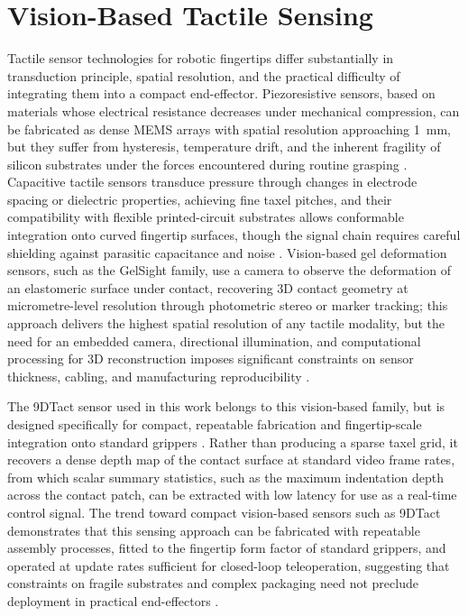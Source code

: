 \documentclass[12pt, a4paper]{report}
\begin{document}
\section{Vision-Based Tactile Sensing}
Tactile sensor technologies for robotic fingertips differ substantially in transduction principle, spatial resolution, and the practical difficulty of integrating them into a compact end-effector. Piezoresistive sensors, based on materials whose electrical resistance decreases under mechanical compression, can be fabricated as dense MEMS arrays with spatial resolution approaching 1~mm, but they suffer from hysteresis, temperature drift, and the inherent fragility of silicon substrates under the forces encountered during routine grasping \cite{dahiya2010}. Capacitive tactile sensors transduce pressure through changes in electrode spacing or dielectric properties, achieving fine taxel pitches, and their compatibility with flexible printed-circuit substrates allows conformable integration onto curved fingertip surfaces, though the signal chain requires careful shielding against parasitic capacitance and noise \cite{dahiya2010}. Vision-based gel deformation sensors, such as the GelSight family, use a camera to observe the deformation of an elastomeric surface under contact, recovering 3D contact geometry at micrometre-level resolution through photometric stereo or marker tracking; this approach delivers the highest spatial resolution of any tactile modality, but the need for an embedded camera, directional illumination, and computational processing for 3D reconstruction imposes significant constraints on sensor thickness, cabling, and manufacturing reproducibility \cite{donggelsight2021}.

The 9DTact sensor used in this work belongs to this vision-based family, but is designed specifically for compact, repeatable fabrication and fingertip-scale integration onto standard grippers \cite{lin2023}. Rather than producing a sparse taxel grid, it recovers a dense depth map of the contact surface at standard video frame rates, from which scalar summary statistics, such as the maximum indentation depth across the contact patch, can be extracted with low latency for use as a real-time control signal. The trend toward compact vision-based sensors such as 9DTact demonstrates that this sensing approach can be fabricated with repeatable assembly processes, fitted to the fingertip form factor of standard grippers, and operated at update rates sufficient for closed-loop teleoperation, suggesting that constraints on fragile substrates and complex packaging need not preclude deployment in practical end-effectors \cite{lin2023}.
\end{document}
